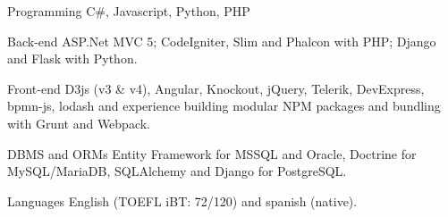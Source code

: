 


\begin{cvskills}


\cvskill
{Programming} %
{C\#, Javascript, Python, PHP} %


\cvskill
{Back-end} %
{ASP.Net MVC 5; CodeIgniter, Slim and Phalcon with PHP; Django and Flask with Python.} %


\cvskill
{Front-end} %
{D3js (v3 \& v4), Angular, Knockout, jQuery, Telerik, DevExpress, bpmn-js, lodash and experience building modular NPM packages and bundling with Grunt and Webpack.} %


\cvskill
{DBMS and ORMs} %
{Entity Framework for MSSQL and Oracle, Doctrine for MySQL/MariaDB, SQLAlchemy and Django for PostgreSQL.} %


\cvskill
{Languages} %
{English (TOEFL iBT: 72/120) and spanish (native).} %


\end{cvskills}